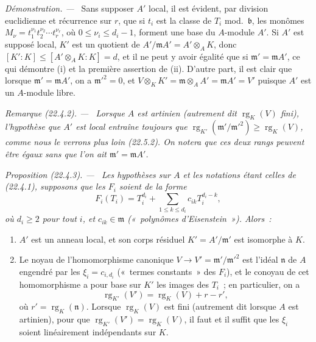 \documentclass[10pt,oneside]{book}
\makeatletter
\newcommand{\setmanualcurrentlabel}[1]{\def\@currentlabel{#1}}
\newcommand{\oldpage}[2][]{%
  \setcounter{footnote}{0}%
  \marginpar{\scriptsize\textbf{#1}~|~#2}\ignorespaces}
\newenvironment{proposition}[1][]{%
  \setmanualcurrentlabel{#1}\par\medskip\noindent\itshape Proposition (#1). ---\ }{\par}
\newenvironment{remark}[1][]{%
  \setmanualcurrentlabel{#1}\par\medskip\noindent\itshape Remarque (#1). ---\ }{\par}
\newenvironment{proof}{%
  \par\medskip\noindent\textit{Démonstration. ---\ }}{\par}
\makeatother
\begin{document}
\begin{proof}
Sans supposer $A'$ local, il est évident, par division euclidienne et
récurrence sur $r$, que si $t_i$ est la classe de $T_i$ mod.~$\mathfrak b$,
les monômes
$M_\nu=t_1^{\nu_1}t_2^{\nu_2}\cdots t_r^{\nu_r}$, où
$0\leqslant\nu_i\leqslant d_i-1$, forment une base du $A$-module $A'$. Si
$A'$ est supposé local, $K'$ est un quotient de
$A'/\mathfrak mA'=A'\otimes_AK$, donc
$[K':K]\leqslant[A'\otimes_AK:K]=d$, et il ne peut y avoir égalité que si
$\mathfrak m'=\mathfrak mA'$, ce qui démontre (i) et la première assertion
de (ii). D'autre part, il est clair que lorsque
$\mathfrak m'=\mathfrak mA'$, on a $\mathfrak m'^2=0$, et
$V\otimes_KK'=\mathfrak m\otimes_AA'=\mathfrak mA'=V'$ puisque $A'$ est
un $A$-module libre.
\end{proof}

\begin{remark}[22.4.2]
\label{0.22.4.2-fr}
Lorsque $A$ est artinien (autrement dit $\operatorname{rg}_K(V)$ fini),
l'hypothèse que $A'$ est local entraîne toujours que
$\operatorname{rg}_{K'}(\mathfrak m'/\mathfrak m'^2)
\geqslant\operatorname{rg}_K(V)$, comme nous le verrons plus loin (22.5.2).
On notera que ces deux rangs peuvent être égaux sans que l'on ait
$\mathfrak m'=\mathfrak mA'$.
\end{remark}

\begin{proposition}[22.4.3]
\label{0.22.4.3-fr}
Les hypothèses sur $A$ et les notations étant celles de (22.4.1), supposons
que les $F_i$ soient de la forme
\begin{equation}
\label{0.22.4.3.1-fr}
  F_i(T_i)=T_i^{d_i}+\sum_{1\leqslant k\leqslant d_i}
  c_{ik}T_i^{d_i-k},
  \tag{22.4.3.1}
\end{equation}
où $d_i\geqslant2$ pour tout $i$, et $c_{ik}\in\mathfrak m$
(«~polynômes d'Eisenstein~»). Alors~:
\begin{enumerate}
  \item[(i)] $A'$ est un anneau local, et son corps résiduel
  $K'=A'/\mathfrak m'$ est isomorphe à $K$.

  \oldpage[0\textsubscript{IV-1}]{194}

  \item[(ii)] Le noyau de l'homomorphisme canonique
  $V\to V'=\mathfrak m'/\mathfrak m'^2$ est l'idéal $\mathfrak n$ de $A$
  engendré par les $\xi_i=c_{i,d_i}$ («~termes constants~» des $F_i$), et
  le conoyau de cet homomorphisme a pour base sur $K'$ les images des $T_i$~;
  en particulier, on a
  \begin{equation}
  \label{0.22.4.3.2-fr}
    \operatorname{rg}_{K'}(V')=\operatorname{rg}_K(V)+r-r',
    \tag{22.4.3.2}
  \end{equation}
  où $r'=\operatorname{rg}_K(\mathfrak n)$. Lorsque
  $\operatorname{rg}_K(V)$ est fini (autrement dit lorsque $A$ est
  artinien), pour que
  $\operatorname{rg}_{K'}(V')=\operatorname{rg}_K(V)$, il faut et il suffit
  que les $\xi_i$ soient linéairement indépendants sur $K$.
\end{enumerate}
\end{proposition}
\end{document}
